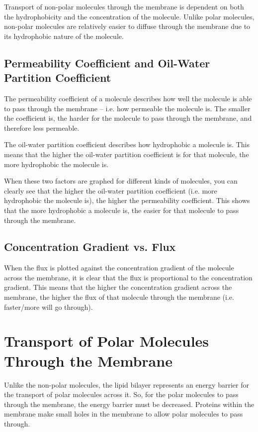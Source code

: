 \documentclass[a4paper, 12pt]{report}
\begin{document}
Transport of non-polar molecules through the membrane is dependent on both the hydrophobicity and the concentration of the molecule.
Unlike polar molecules, non-polar molecules are relatively easier to diffuse through the membrane due to its hydrophobic nature of the molecule.

\subsection{Permeability Coefficient and Oil-Water Partition Coefficient}

The permeability coefficient of a molecule describes how well the molecule is able to pass through the membrane -- i.e. how permeable the molecule is.
The smaller the coefficient is, the harder for the molecule to pass through the membrane, and therefore less permeable.

The oil-water partition coefficient describes how hydrophobic a molecule is.
This means that the higher the oil-water partition coefficient is for that molecule, the more hydrophobic the molecule is.

When these two factors are graphed for different kinds of molecules, you can clearly see that the higher the oil-water partition coefficient (i.e. more hydrophobic the molecule is), the higher the permeability coefficient.
This shows that the more hydrophobic a molecule is, the easier for that molecule to pass through the membrane.

\subsection{Concentration Gradient vs. Flux}

When the  flux  is plotted against the concentration gradient of the molecule across the membrane, it is clear that the flux is proportional to the concentration gradient.
This means that the higher the concentration gradient across the membrane, the higher the flux of that molecule through the membrane (i.e. faster/more will go through).

\section{Transport of Polar Molecules Through the Membrane}

Unlike the non-polar molecules, the lipid bilayer represents an energy barrier for the transport of polar molecules across it.
So, for the polar molecules to pass through the membrane, the energy barrier must be decreased.
Proteins within the membrane make small holes in the membrane to allow polar molecules to pass through.
\end{document}
